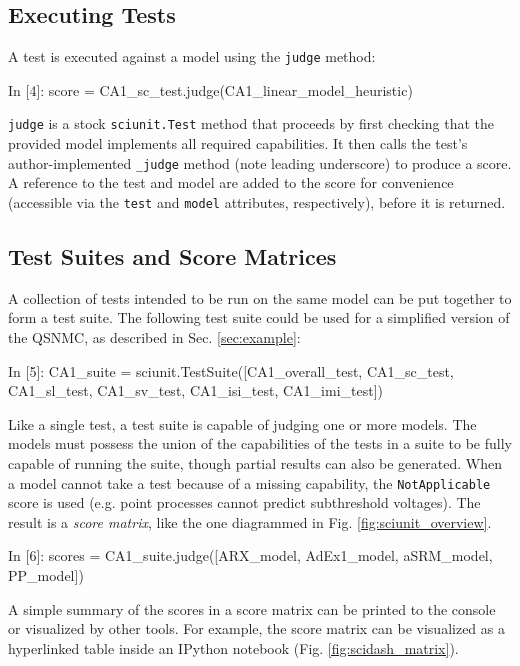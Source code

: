 \documentclass{frontiersSCNS}
\let\verbx\lstinline
\begin{document}
\subsection{Executing Tests} A test is executed against a model using the \verbx{judge} method:
\begin{ipy}
  In [4]: score = CA1_sc_test.judge(CA1_linear_model_heuristic)
\end{ipy}

\verbx{judge} is a stock \verbx{sciunit.Test} method that proceeds by first checking that the provided model implements all required capabilities. 
It then calls the test's author-implemented \verbx{_judge} method (note leading underscore) to produce a score. 
A reference to the test and model are added to the score for convenience (accessible via the \verbx{test} and \verbx{model} attributes, respectively), before it is returned.

\subsection{Test Suites and Score Matrices}\label{sec:visualization} A collection of tests intended to be run on the same model can be put together to form a test suite.
The following test suite could be used for a simplified version of the QSNMC, as described in Sec. \ref{sec:example}:  
\begin{ipy}
  In [5]: CA1_suite = sciunit.TestSuite([CA1_overall_test, CA1_sc_test, CA1_sl_test, CA1_sv_test, CA1_isi_test, CA1_imi_test])
\end{ipy}
Like a single test, a test suite is capable of judging one or more models. 
The models must possess the union of the capabilities of the tests in a suite to be fully capable of running the suite, though partial results can also be generated. 
When a model cannot take a test because of a missing capability, the \texttt{NotApplicable} score is used (e.g. point processes cannot predict subthreshold voltages). 
The result is a \emph{score matrix}, like the one diagrammed in Fig. \ref{fig:sciunit_overview}.
\begin{ipy}
  In [6]: scores = CA1_suite.judge([ARX_model, AdEx1_model, aSRM_model, PP_model])
\end{ipy}
A simple summary of the scores in a score matrix can be printed to the console or visualized by other tools.  
For example, the score matrix can be visualized as a hyperlinked table inside an IPython notebook \citep{perez_ipython_2007} (Fig. \ref{fig:scidash_matrix}).
\end{document}
